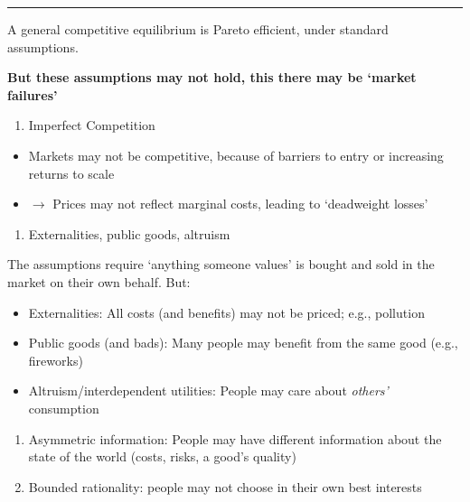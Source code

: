 \documentclass[]{article}
\providecommand{\tightlist}{%
  \setlength{\itemsep}{0pt}\setlength{\parskip}{0pt}}
\begin{document}
\begin{center}\rule{0.5\linewidth}{\linethickness}\end{center}

\begin{description}
\tightlist
\item[First fundamental theorem of welfare economics]
A general competitive equilibrium is Pareto efficient, under standard assumptions.
\end{description}

\bigskip

\textbf{But these assumptions may not hold, this there may be `market failures'}

\begin{enumerate}
\def\labelenumi{\arabic{enumi}.}
\tightlist
\item
  Imperfect Competition
\end{enumerate}

\begin{itemize}
\tightlist
\item
  Markets may not be competitive, because of barriers to entry or increasing returns to scale
\item
  \(\rightarrow\) Prices may not reflect marginal costs, leading to `deadweight losses'
\end{itemize}

\bigskip

\begin{enumerate}
\def\labelenumi{\arabic{enumi}.}
\setcounter{enumi}{1}
\tightlist
\item
  Externalities, public goods, altruism
\end{enumerate}

The assumptions require `anything someone values' is bought and sold in the market on their own behalf.
But:

\begin{itemize}
\tightlist
\item
  Externalities: All costs (and benefits) may not be priced; e.g., pollution
\item
  Public goods (and bads): Many people may benefit from the same good (e.g., fireworks)
\item
  Altruism/interdependent utilities: People may care about \emph{others'} consumption
\end{itemize}

\bigskip

\begin{enumerate}
\def\labelenumi{\arabic{enumi}.}
\setcounter{enumi}{2}
\item
  Asymmetric information: People may have different information about the state of the world (costs, risks, a good's quality)
\item
  Bounded rationality: people may not choose in their own best interests
\end{enumerate}
\end{document}
